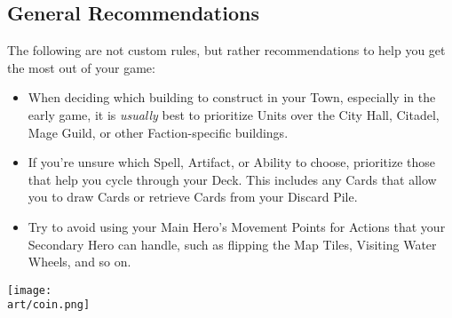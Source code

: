 \begin{multicols}{2}

\subsection*{General Recommendations}

The following are not custom rules, but rather recommendations to help you get the most out of your game:

\begin{itemize}
  \item When deciding which building to construct in your Town, especially in the early game, it is \textit{usually} best to prioritize Units over the City Hall, Citadel, Mage Guild, or other Faction-specific buildings.
  \item If you're unsure which Spell, Artifact, or Ability to choose, prioritize those that help you cycle through your Deck.
    This includes any Cards that allow you to draw Cards or retrieve Cards from your Discard Pile.
  \item Try to avoid using your Main Hero's Movement Points for Actions that your Secondary Hero can handle, such as flipping the Map Tiles, Visiting Water Wheels, and so on.
\end{itemize}

\begin{center}
  \texttt{[image: \\art/coin.png]}
\end{center}

\end{multicols}
